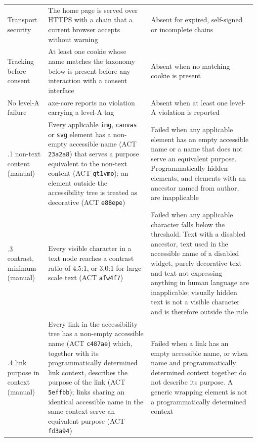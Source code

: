 \documentclass[pdflatex,sn-basic,Numbered,iicol]{sn-jnl}
\theoremstyle{thmstyleone}
\theoremstyle{thmstyletwo}
\theoremstyle{thmstylethree}
\begin{document}
\begin{appendices}
\begin{longtable}{@{}>{\RaggedRight}p{2.7cm}>{\RaggedRight}p{4.75cm}>{\RaggedRight\arraybackslash}p{4.55cm}@{}}
	\addlinespace
	Transport security & The home page is served over HTTPS with a chain that a current browser accepts without warning & Absent for expired, self-signed or incomplete chains \\
	\addlinespace
	Tracking before consent & At least one cookie whose name matches the taxonomy below is present before any interaction with a consent interface & Absent when no matching cookie is present \\
	\addlinespace
	No level-A failure & axe-core reports no violation carrying a level-A tag & Absent when at least one level-A violation is reported \\
	\addlinespace
	1.1.1 non-text content (manual) & Every applicable \verb|img|, \verb|canvas| or \verb|svg| element has a non-empty accessible name (ACT \texttt{23a2a8}) that serves a purpose equivalent to the non-text content (ACT \texttt{qt1vmo}); an element outside the accessibility tree is treated as decorative (ACT \texttt{e88epe}) & Failed when any applicable element has an empty accessible name or a name that does not serve an equivalent purpose. Programmatically hidden elements, and elements with an ancestor named from author, are inapplicable \\
	\addlinespace
	1.4.3 contrast, minimum (manual) & Every visible character in a text node reaches a contrast ratio of 4.5:1, or 3.0:1 for large-scale text (ACT \texttt{afw4f7}) & Failed when any applicable character falls below the threshold. Text with a disabled ancestor, text used in the accessible name of a disabled widget, purely decorative text and text not expressing anything in human language are inapplicable; visually hidden text is not a visible character and is therefore outside the rule \\
	\addlinespace
	2.4.4 link purpose in context (manual) & Every link in the accessibility tree has a non-empty accessible name (ACT \texttt{c487ae}) which, together with its programmatically determined link context, describes the purpose of the link (ACT \texttt{5effbb}); links sharing an identical accessible name in the same context serve an equivalent purpose (ACT \texttt{fd3a94}) & Failed when a link has an empty accessible name, or when name and programmatically determined context together do not describe its purpose. A generic wrapping element is not a programmatically determined context \\
\end{longtable}
\normalsize


\end{appendices}
\end{document}
